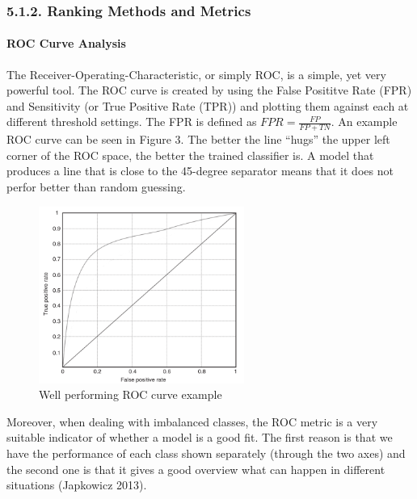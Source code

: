 \documentclass[12pt,]{article}
\let\oldparagraph\paragraph
\renewcommand{\paragraph}[1]{\oldparagraph{#1}\mbox{}}
\begin{document}
\hypertarget{ranking-methods-and-metrics}{%
\subsubsection{5.1.2. Ranking Methods and
Metrics}\label{ranking-methods-and-metrics}}

\hypertarget{roc-curve-analysis}{%
\paragraph{ROC Curve Analysis}\label{roc-curve-analysis}}

The Receiver-Operating-Characteristic, or simply ROC, is a simple, yet
very powerful tool. The ROC curve is created by using the False
Posititve Rate (FPR) and Sensitivity (or True Positive Rate (TPR)) and
plotting them against each at different threshold settings. The FPR is
defined as \(FPR=\frac{FP}{FP+TN}\). An example ROC curve can be seen in
Figure 3. The better the line ``hugs'' the upper left corner of the ROC
space, the better the trained classifier is. A model that produces a
line that is close to the 45-degree separator means that it does not
perfor better than random guessing.

\begin{figure}
\centering
\includegraphics[width=0.6\textwidth,height=\textheight]{figures/roc_curve_example.png}
\caption{Well performing ROC curve example}
\end{figure}

Moreover, when dealing with imbalanced classes, the ROC metric is a very
suitable indicator of whether a model is a good fit. The first reason is
that we have the performance of each class shown separately (through the
two axes) and the second one is that it gives a good overview what can
happen in different situations (Japkowicz 2013).
\end{document}
